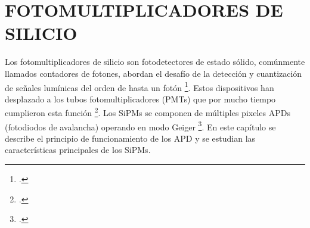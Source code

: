 
\chapter{FOTOMULTIPLICADORES DE SILICIO}
\label{Cap:MarcoT}
Los fotomultiplicadores de silicio son fotodetectores de estado sólido, comúnmente llamados contadores de fotones, abordan el desafío de la detección y cuantización de señales lumínicas del orden de hasta un fotón \footcite{Intro_SIPM_Sensl}. Estos dispositivos han desplazado a los tubos fotomultiplicadores (PMTs) que por mucho tiempo cumplieron esta función \footcite{MPPC_note}. Los SiPMs se componen de múltiples pixeles APDs (fotodiodos de avalancha) operando en modo Geiger \footcite{Apd_Hamamatsu}. En este capítulo se describe el principio de funcionamiento de los APD y se estudian las características principales de los SiPMs.
